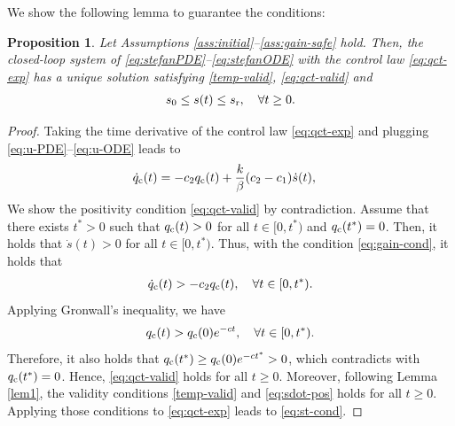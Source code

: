 \documentclass[letterpaper, 10 pt, conference]{cls/ieeeconf}
\newtheorem{proposition}{Proposition}
\theoremstyle{definition}
\begin{document}
We show the following lemma to guarantee the conditions: 
\begin{proposition} \label{prop:safety}
    Let Assumptions \ref{ass:initial}--\ref{ass:gain-safe} hold. Then, the closed-loop system of \eqref{eq:stefanPDE}--\eqref{eq:stefanODE} with the control law \eqref{eq:qct-exp} 
    has a unique solution satisfying \eqref{temp-valid}, \eqref{eq:qct-valid} and 
    \begin{align} \label{eq:st-cond}
        s_0 \leq s(t) \leq s_{\rm r}, \quad \forall t \geq 0. 
    \end{align}
\end{proposition}
\begin{proof}
    Taking the time derivative of the control law \eqref{eq:qct-exp} and plugging \eqref{eq:u-PDE}--\eqref{eq:u-ODE} leads to  
\begin{align}
    \dot q_{\rm c}(t)
    & =  - c_2 q_{\rm c}(t) + \frac{k}{\beta} (c_2 - c_1 ) \dot s(t), \label{eq:qcdot}
\end{align}
We show the positivity condition \eqref{eq:qct-valid} by contradiction. Assume that there exists $t^* >0$ such that $q_{\rm c}(t) > 0$ for all $t \in [0, t^*)$ and $q_{\rm c}(t^*) = 0$. Then, it holds that $\dot s(t) >0 $ for all $t \in [0, t^*)$. Thus, with the condition \eqref{eq:gain-cond}, 
it holds that 
\begin{align}
   \dot q_{\rm c}(t) > - c_2 q_{\rm c}(t), \quad \forall t \in [0, t^*). 
\end{align}
Applying Gronwall's inequality, we have 
\begin{align}
    q_{\rm c}(t) > q_{\rm c}(0) e^{-ct}, \quad \forall t \in [0, t^*). 
\end{align}
Therefore, it also holds that $q_{\rm c}(t^*) \geq q_{\rm c}(0) e^{- c t^*} > 0$, which contradicts with $q_{\rm c}(t^*)= 0$. Hence, \eqref{eq:qct-valid} holds for all $t \geq 0$. Moreover, following Lemma \ref{lem1}, the validity conditions \eqref{temp-valid} and \eqref{eq:sdot-pos} holds for all $t \geq 0$. Applying those conditions to \eqref{eq:qct-exp} leads to \eqref{eq:st-cond}. 
\end{proof}
\end{document}

